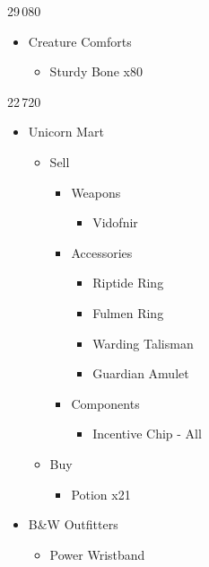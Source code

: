 \begin{paracol}{2}
\begin{shop}{29\,080}
\begin{itemize}
\begin{itemize}
			      \end{itemize}
			\item Creature Comforts
			      \begin{itemize}
				      \item Sturdy Bone x80
			      \end{itemize}
		\end{itemize}
	\end{shop}
	\switchcolumn
	\begin{shop}{22\,720}
		\begin{itemize}
			\item Unicorn Mart
			      \begin{itemize}
				      \item Sell
				            \begin{itemize}
					            \item Weapons
					                  \begin{itemize}
						                  \item Vidofnir
					                  \end{itemize}
					            \item Accessories
					                  \begin{itemize}
						                  \item Riptide Ring
						                  \item Fulmen Ring
						                  \item Warding Talisman
						                  \item Guardian Amulet
					                  \end{itemize}
					            \item Components
					                  \begin{itemize}
						                  \item Incentive Chip - All
					                  \end{itemize}
				            \end{itemize}
				      \item Buy
				            \begin{itemize}
					            \item Potion x21
				            \end{itemize}
			      \end{itemize}
			\item B\&W Outfitters
			      \begin{itemize}
				      \item Power Wristband

\end{itemize}
\end{itemize}
\end{shop}
\end{paracol}
